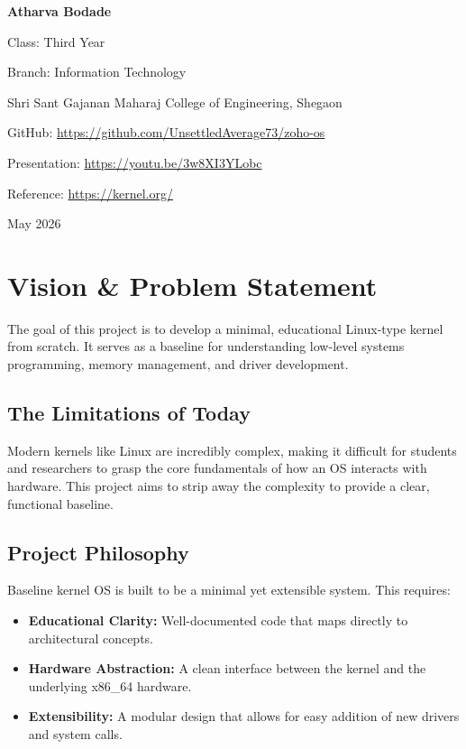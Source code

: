 \documentclass[12pt,a4paper]{report}
\begin{document}
\begin{titlepage}
    \vspace{0.8cm}
    {\large\bfseries Atharva Bodade} \par
     \vspace{0.2cm}
    {\small Class: Third Year \par}
    \vspace{0.2cm}
    {\small Branch: Information Technology \par}
    \vspace{0.12cm}
    {\small Shri Sant Gajanan Maharaj College of Engineering, Shegaon \par}
    \vspace{0.25cm}
    {\small GitHub: \href{https://github.com/UnsettledAverage73/zoho-os}{https://github.com/UnsettledAverage73/zoho-os}} \par
    \vspace{0.2cm}
    {\small Presentation: \href{https://youtu.be/3w8XI3YLobc}{https://youtu.be/3w8XI3YLobc}} \par
    \vspace{0.2cm}
    {\small Reference: \href{https://kernel.org/}{https://kernel.org/}} \par

    \vfill
    {\large May 2026}
\end{titlepage}

\tableofcontents
\newpage

\chapter{Vision \& Problem Statement}
The goal of this project is to develop a minimal, educational Linux-type kernel from scratch. It serves as a baseline for understanding low-level systems programming, memory management, and driver development.

\section{The Limitations of Today}
Modern kernels like Linux are incredibly complex, making it difficult for students and researchers to grasp the core fundamentals of how an OS interacts with hardware. This project aims to strip away the complexity to provide a clear, functional baseline.

\section{Project Philosophy}
Baseline kernel OS is built to be a minimal yet extensible system. This requires:
\begin{itemize}
    \item \textbf{Educational Clarity:} Well-documented code that maps directly to architectural concepts.
    \item \textbf{Hardware Abstraction:} A clean interface between the kernel and the underlying x86\_64 hardware.
    \item \textbf{Extensibility:} A modular design that allows for easy addition of new drivers and system calls.
\end{itemize}
\end{document}
